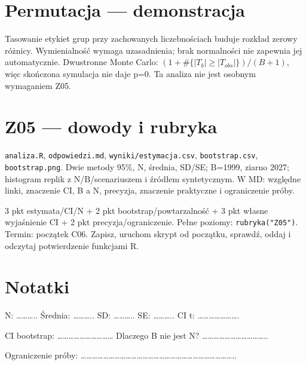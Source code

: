 \documentclass[
  polish,
  11pt,
  a4paper,
]{article}
\begin{document}
\section{Permutacja --- demonstracja}\label{permutacja-demonstracja}

Tasowanie etykiet grup przy zachowanych liczebnościach buduje rozkład
zerowy różnicy. Wymienialność wymaga uzasadnienia; brak normalności nie
zapewnia jej automatycznie. Dwustronne Monte Carlo:
\((1+\#\{|T_b|\geq|T_{obs}|\})/(B+1)\), więc skończona symulacja nie
daje p=0. Ta analiza nie jest osobnym wymaganiem Z05.

\section{Z05 --- dowody i rubryka}\label{z05-dowody-i-rubryka}

\texttt{analiza.R}, \texttt{odpowiedzi.md},
\texttt{wyniki/estymacja.csv}, \texttt{bootstrap.csv},
\texttt{bootstrap.png}. Dwie metody 95\%, N, średnia, SD/SE; B=1999,
ziarno 2027; histogram replik z N/B/scenariuszem i źródłem syntetycznym.
W MD: względne linki, znaczenie CI, B a N, precyzja, znaczenie
praktyczne i ograniczenie próby.

3 pkt estymata/CI/N + 2 pkt bootstrap/powtarzalność + 3 pkt własne
wyjaśnienie CI + 2 pkt precyzja/ograniczenie. Pełne poziomy:
\texttt{rubryka("Z05")}. Termin: początek C06. Zapisz, uruchom skrypt od
początku, sprawdź, oddaj i odczytaj potwierdzenie funkcjami R.

\section{Notatki}\label{notatki}

N: \ldots\ldots\ldots.. Średnia: \ldots\ldots\ldots.. SD:
\ldots\ldots\ldots.. SE: \ldots\ldots\ldots.. CI t:
\ldots\ldots\ldots\ldots\ldots\ldots\ldots.

CI bootstrap:
\ldots\ldots\ldots\ldots\ldots\ldots\ldots\ldots\ldots\ldots{} Dlaczego
B nie jest N?
\ldots\ldots\ldots\ldots\ldots\ldots\ldots\ldots\ldots\ldots\ldots..

Ograniczenie próby:
\ldots\ldots\ldots\ldots\ldots\ldots\ldots\ldots\ldots\ldots\ldots\ldots\ldots\ldots\ldots\ldots\ldots\ldots\ldots\ldots\ldots\ldots\ldots\ldots\ldots\ldots\ldots..
\end{document}
